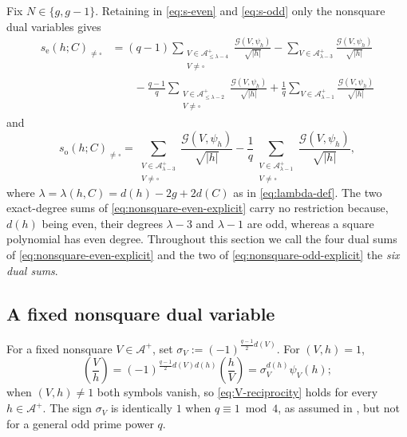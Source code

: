 \documentclass[a4paper,reqno]{amsart}
\numberwithin{equation}{section}
\theoremstyle{remark}
\theoremstyle{definition}
\newcommand{\A}{\mathcal{A}}
\newcommand{\Gc}{\mathcal{G}}
\begin{document}
Fix $N\in\{g,g-1\}$. Retaining in \eqref{eq:s-even} and \eqref{eq:s-odd}
only the nonsquare dual variables gives
\begin{align}\label{eq:nonsquare-even-explicit}
s_{\mathrm e}(h;C)_{\ne\square}
&=(q-1)\sum_{\substack{V\in\A^+_{\le\lambda-4}\\ V\ne\square}}
\frac{\Gc(V,\psi_h)}{\sqrt{|h|}}
-\sum_{V\in\A^+_{\lambda-3}}\frac{\Gc(V,\psi_h)}{\sqrt{|h|}}
\nonumber\\
&\qquad
-\frac{q-1}{q}\sum_{\substack{V\in\A^+_{\le\lambda-2}\\ V\ne\square}}
\frac{\Gc(V,\psi_h)}{\sqrt{|h|}}
+\frac{1}{q}\sum_{V\in\A^+_{\lambda-1}}\frac{\Gc(V,\psi_h)}{\sqrt{|h|}}
\end{align}
and
\begin{equation}\label{eq:nonsquare-odd-explicit}
s_{\mathrm o}(h;C)_{\ne\square}
=\sum_{\substack{V\in\A^+_{\lambda-3}\\ V\ne\square}}
\frac{\Gc(V,\psi_h)}{\sqrt{|h|}}
-\frac{1}{q}\sum_{\substack{V\in\A^+_{\lambda-1}\\ V\ne\square}}
\frac{\Gc(V,\psi_h)}{\sqrt{|h|}},
\end{equation}
where $\lambda=\lambda(h,C)=d(h)-2g+2d(C)$ as in \eqref{eq:lambda-def}.
The two exact-degree sums of \eqref{eq:nonsquare-even-explicit} carry no
restriction because, $d(h)$ being even, their degrees $\lambda-3$ and
$\lambda-1$ are odd, whereas a square polynomial has even degree.
Throughout this section we call the four dual sums of
\eqref{eq:nonsquare-even-explicit} and the two of
\eqref{eq:nonsquare-odd-explicit} the \emph{six dual sums}.

\subsection{A fixed nonsquare dual variable}

For a fixed nonsquare $V\in\A^+$, set
$\sigma_V := (-1)^{\frac{q-1}{2}d(V)}$. For $(V,h)=1$,
\begin{equation}\label{eq:V-reciprocity}
\left(\frac{V}{h}\right)
=(-1)^{\frac{q-1}{2}d(V)d(h)}\left(\frac{h}{V}\right)
=\sigma_V^{d(h)}\psi_V(h);
\end{equation}
when $(V,h)\ne1$ both symbols vanish, so \eqref{eq:V-reciprocity} holds for
every $h\in\A^+$. The sign $\sigma_V$ is identically $1$ when
$q\equiv1\bmod4$, as assumed in \cite{Fl17-1}, but not for a general odd
prime power $q$.
\end{document}
